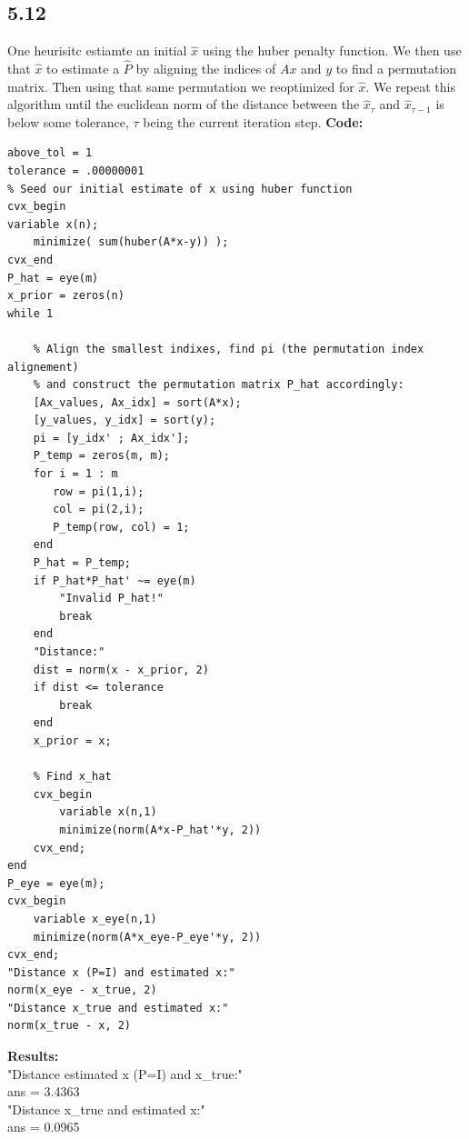 \documentclass[12pt]{article}
\begin{document}
\subsection*{5.12}
One heurisitc estiamte an initial $\hat{x}$ using the huber penalty function. We then use that $\hat{x}$ to estimate a $\hat{P}$ by aligning the indices of $Ax$ and $y$ to find a permutation matrix. Then using that same permutation we reoptimized for $\hat{x}$. We repeat this algorithm until the euclidean norm of the distance between the $\hat{x}_{\tau}$ and $\hat{x}_{\tau-1}$ is below some tolerance, $\tau$ being the current iteration step.
\textbf{Code:}\\
\begin{lstlisting}
above_tol = 1
tolerance = .00000001
% Seed our initial estimate of x using huber function
cvx_begin
variable x(n);
    minimize( sum(huber(A*x-y)) );
cvx_end
P_hat = eye(m)
x_prior = zeros(n)
while 1
    
    % Align the smallest indixes, find pi (the permutation index alignement) 
    % and construct the permutation matrix P_hat accordingly:
    [Ax_values, Ax_idx] = sort(A*x);
    [y_values, y_idx] = sort(y);
    pi = [y_idx' ; Ax_idx'];
    P_temp = zeros(m, m);
    for i = 1 : m
       row = pi(1,i);
       col = pi(2,i);
       P_temp(row, col) = 1;
    end
    P_hat = P_temp;
    if P_hat*P_hat' ~= eye(m)
        "Invalid P_hat!"
        break
    end
    "Distance:"
    dist = norm(x - x_prior, 2)
    if dist <= tolerance
        break
    end
    x_prior = x;
    
    % Find x_hat
    cvx_begin
        variable x(n,1)
        minimize(norm(A*x-P_hat'*y, 2))
    cvx_end;
end
P_eye = eye(m);
cvx_begin
    variable x_eye(n,1)
    minimize(norm(A*x_eye-P_eye'*y, 2))
cvx_end;
"Distance x (P=I) and estimated x:"
norm(x_eye - x_true, 2)
"Distance x_true and estimated x:"
norm(x_true - x, 2)
\end{lstlisting}
\textbf{Results:}\\
"Distance estimated x (P=I) and x\_true:"\\
ans = 3.4363\\
"Distance x\_true and estimated x:"\\
ans = 0.0965\\
\end{document}
